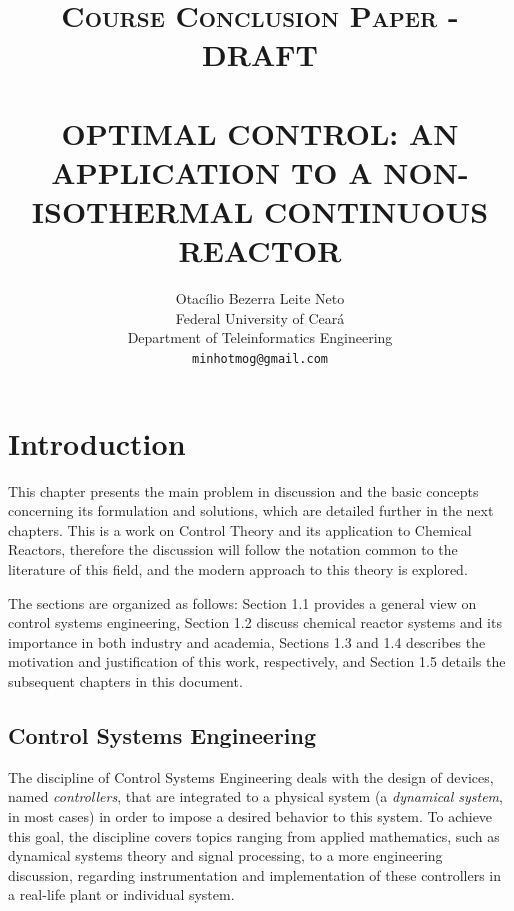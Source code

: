 \documentclass[a4paper,11pt]{book}
\title{ \normalsize \textsc{Course Conclusion Paper - DRAFT} 
        \\[2.0cm]             
        \HRule{0.5pt} \\              
        \LARGE \textbf{\uppercase{Optimal Control: An application to a non-isothermal continuous reactor}}
        \HRule{2pt} \\[0.5cm]  
}
\author{
        Otacílio Bezerra Leite Neto\\   
        Federal University of Ceará\\  
        Department of Teleinformatics Engineering\\
        \texttt{minhotmog@gmail.com} \\
}
\makeatletter
\numberwithin{figure}{chapter}
\numberwithin{equation}{chapter}
\numberwithin{table}{chapter}
\theoremstyle{definition}
\def\printtitle{
    {\centering \@title\par}}
\def\printauthor{
    {\centering \large \@author}}
\makeatother
\begin{document}
\thispagestyle{empty}       %

\printtitle                 %
    \vfill
\printauthor                %
\newpage

\thispagestyle{empty}   
\setcounter{secnumdepth}{1}
\setcounter{tocdepth}{1}
\tableofcontents

\clearpage
\setcounter{page}{1}
\chapter{Introduction}

This chapter presents the main problem in discussion and the basic concepts concerning its formulation and solutions, which are detailed further in the next chapters. This is a work on Control Theory and its application to Chemical Reactors, therefore the discussion will follow the notation common to the literature of this field, and the modern approach to this theory is explored. 

The sections are organized as follows: Section 1.1 provides a general view on control systems engineering, Section 1.2 discuss chemical reactor systems and its importance in both industry and academia, Sections 1.3 and 1.4 describes the motivation and justification of this work, respectively, and Section 1.5 details the subsequent chapters in this document.

\section{Control Systems Engineering}

The discipline of Control Systems Engineering deals with the design of devices, named \textit{controllers}, that are integrated to a physical system (a \textit{dynamical system}, in most cases) in order to impose a desired behavior to this system. To achieve this goal, the discipline covers topics ranging from applied mathematics, such as dynamical systems theory and signal processing, to a more engineering discussion, regarding instrumentation and implementation of these controllers in a real-life plant or individual system. 
\end{document}
